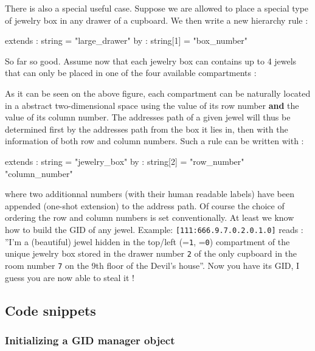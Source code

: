 There is also a special useful case. Suppose we are allowed
to place a special type of jewelry box in any drawer of a cupboard.
We then write a new hierarchy rule :
\begin{ShellVerbatim}
[category="jewelry_box" type="110"]
extends : string    = "large_drawer"
by      : string[1] = "box_number"
\end{ShellVerbatim}
So far so good. Assume now that each jewelry box can contains
up to 4 jewels that can only be placed in one of the
four available compartments :

    \begin{center}
      \scalebox{1.0}{}
    \end{center}
As it can be seen on the above figure,
each compartment can be naturally located in a abstract
two-dimensional space using the value of its row number
\textbf{and} the value of its column number.
The addresses path of a given jewel will thus be determined 
first by the addresses path from the box it lies in, then
with the information of both row and column numbers.
Such a rule can be written with : 
\begin{ShellVerbatim}
[category="jewel" type="111"]
extends : string    = "jewelry_box"
by      : string[2] = "row_number" "column_number"
\end{ShellVerbatim}
\pn where  two additionnal numbers (with their  human readable labels)
have been appended (one-shot extension) to the address path. Of course
the  choice   of  ordering   the  row  and   column  numbers   is  set
conventionally. At  least we know how  to build the GID  of any jewel.
Example: \verb+[111:666.9.7.0.2.0.1.0]+ reads : \\
 ''I'm a  (beautiful) jewel
hidden in the top/left (=\texttt{1}, =\texttt{0})
compartment  of the  unique jewelry  box stored  in the  drawer number
\texttt{2} of the  only cupboard in the room  number \texttt{7} on the
9th floor of the Devil's house''. Now you have its GID, 
I guess you are now able to steal it !

\pagebreak
\subsection{Code snippets}

\subsubsection{Initializing a GID manager object}

